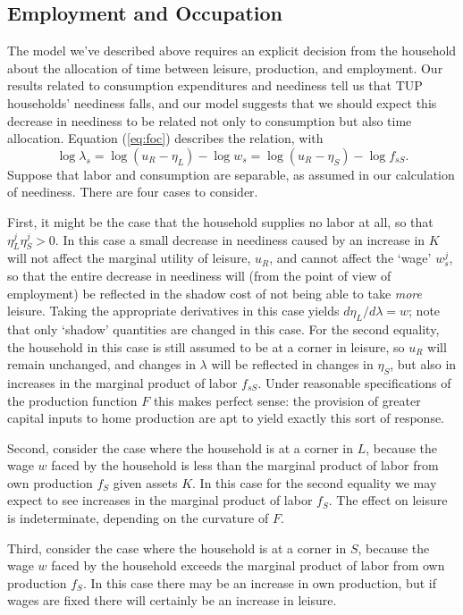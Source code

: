 \documentclass[11pt]{article}
\newcommand{\Eq}[1]{(\ref{eq:#1})}
\begin{document}
\subsection*{Employment and Occupation}
\label{sec-8-2}

The model we've described above requires an explicit decision from the
household about the allocation of time between leisure, production,
and employment.  Our results related to consumption expenditures and
neediness tell us that TUP households' neediness falls, and our model
suggests that we should expect this decrease in neediness to be
related not only to consumption but also time allocation.
Equation \Eq{foc} describes the relation, with
\[
   \log\lambda_s = \log (u_R - \eta_L) - \log w_s = \log (u_R - \eta_S) - \log f_{sS}.
\]
Suppose that labor and consumption are separable, as assumed in our
calculation of neediness.  There are four cases to consider.  

First, it might be the case that the household supplies no labor at
all, so that $\eta^j_L\eta^j_S>0$.  In this case a small decrease in
neediness caused by an increase in $K$ will not affect the marginal
utility of leisure, $u_R$, and cannot affect the `wage' $w^j_s$, so
that the entire decrease in neediness will (from the point of view of
employment) be reflected in the shadow cost of not being able to take
\emph{more} leisure.  Taking the appropriate derivatives in this case
yields $d\eta_L/d\lambda=w$; note that only `shadow' quantities are
changed in this case.  For the second equality, the household in this
case is still assumed to be at a corner in leisure, so $u_R$ will
remain unchanged, and changes in $\lambda$ will be reflected in
changes in $\eta_S$, but also in increases in the marginal product of
labor $f_{sS}$.  Under reasonable specifications of the production
function $F$ this makes perfect sense: the provision of greater
capital inputs to home production are apt to yield exactly this
sort of response.

Second, consider the case where the household is at a corner in $L$,
because the wage $w$ faced by the household is less than the marginal
product of labor from own production $f_S$ given assets $K$.  In this
case for the second equality we may expect to see increases 
in the marginal product of labor $f_S$.  The effect on leisure is
indeterminate, depending on the curvature of $F$.

Third, consider the case where the household is at a corner in $S$,
because the wage $w$ faced by the household exceeds the marginal
product of labor from own production $f_S$.  In this case there may be
an increase in own production, but if wages are fixed there will
certainly be an increase in leisure.
\end{document}
